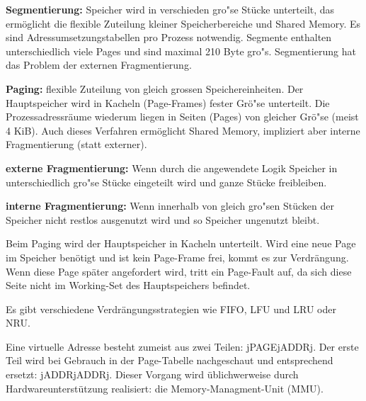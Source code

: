 \begin{answer}
  \textbf{Segmentierung:} Speicher wird in verschieden gro"se Stücke unterteilt, das ermöglicht die flexible Zuteilung kleiner Speicherbereiche und Shared Memory. Es sind Adressumsetzungstabellen pro Prozess notwendig. Segmente enthalten unterschiedlich viele Pages und sind maximal 210 Byte gro"s. Segmentierung hat das Problem der externen Fragmentierung.

  \textbf{Paging:} flexible Zuteilung von gleich grossen Speichereinheiten. Der Hauptspeicher wird in Kacheln (Page-Frames)
  fester Grö"se unterteilt. Die Prozessadressräume wiederum liegen in Seiten (Pages) von
  gleicher Grö"se (meist 4 KiB). Auch dieses Verfahren ermöglicht Shared Memory, impliziert aber interne Fragmentierung (statt externer).

  \textbf{externe Fragmentierung:} Wenn durch die angewendete Logik Speicher in unterschiedlich gro"se
  Stücke eingeteilt wird und ganze Stücke freibleiben.

  \textbf{interne Fragmentierung:} Wenn innerhalb von gleich gro"sen Stücken der Speicher nicht restlos
  ausgenutzt wird und so Speicher ungenutzt bleibt.
\end{answer}

\begin{answer}
  Beim Paging wird der Hauptspeicher in Kacheln  unterteilt.
  Wird eine neue Page im Speicher benötigt und ist kein Page-Frame frei, kommt es zur Verdrängung.
  Wenn diese Page später angefordert wird, tritt ein Page-Fault auf, da sich diese Seite nicht im Working-Set des Hauptspeichers befindet.

  Es gibt verschiedene Verdrängungsstrategien wie FIFO, LFU und LRU oder NRU.
\end{answer}

\begin{answer}
  Eine virtuelle Adresse besteht zumeist aus zwei Teilen: jPAGEjADDRj. Der erste Teil wird bei Gebrauch in der Page-Tabelle nachgeschaut und entsprechend ersetzt: jADDRjADDRj.
  Dieser Vorgang wird üblichwerweise durch Hardwareunterstützung realisiert: die Memory-Managment-Unit (MMU).
\end{answer}

